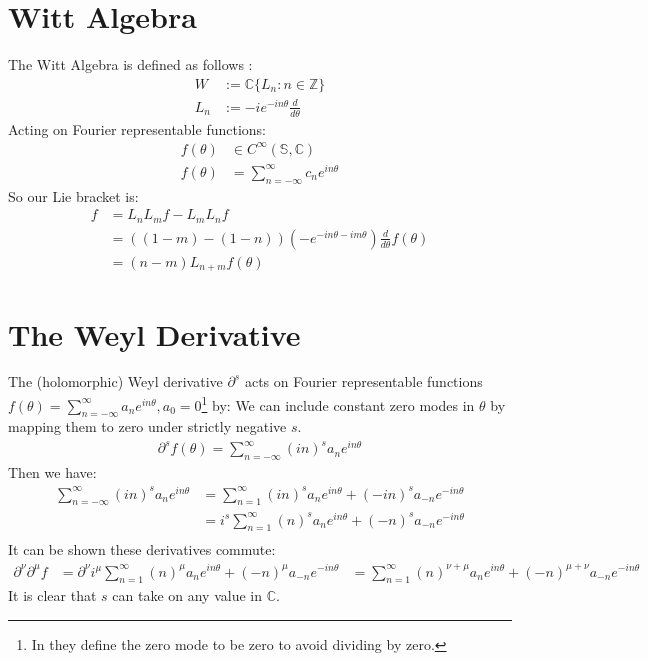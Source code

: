 \documentclass{artjlt}
\newcommand{\?}{\textbackslash}
\newcommand{\C}{\mathbb{C}}
\newcommand{\Z}{\mathbb{Z}}
\begin{document}
\section{Witt Algebra}
The Witt Algebra is defined as follows \cite{Schottenloher1997} \cite{Nam1999}:
\begin{align*}
W &:= \C \{L_n: n \in \Z\} \\
L_n &:= -i e^{-i n \theta} \frac{d}{d \theta}
\end{align*}
Acting on Fourier representable functions:
\begin{align*}
f(\theta) &\in C^\infty (\mathbb{S},\C) \\
f(\theta) &=\sum_{n=-\infty}^{\infty} c_n e^{i n \theta}
\end{align*} 
So our Lie bracket is:
\begin{align*}
  [L_n, L_m] f &= L_n L_m f - L_m L_n f \\
  &= ((1-m)-(1-n))(- e^{-i n \theta - i m \theta}) \frac{d}{d \theta} f(\theta) \\
  &=(n-m)L_{n+m} f(\theta)
\end{align*}
\section{The Weyl Derivative}
The (holomorphic) Weyl derivative $\partial^s$ \cite{article} acts on Fourier representable functions 
$f(\theta)= \sum_{n=-\infty}^\infty a_n e^{i n \theta}, a_0 = 0$\footnote{In \cite{article} they define the zero mode to be zero to avoid dividing by zero.} by:
We can include constant zero modes in $\theta$ by mapping them to zero under strictly negative $s$.
\begin{align*}
  \partial^s f(\theta)= \sum_{n=-\infty}^\infty (in)^s a_n e^{i n \theta}
\end{align*}
Then we have:
\begin{align*}
  \sum_{n=-\infty}^\infty (in)^s a_n e^{i n \theta} &= \sum_{n=1}^\infty (in)^s a_n e^{i n \theta} + (-in)^s a_{-n} e^{-i n \theta} \\
  &= i^s \sum_{n=1}^\infty (n)^s a_n e^{i n \theta} + (-n)^s a_{-n} e^{-i n \theta} \\
\end{align*}
It can be shown these derivatives commute:
\begin{align*}
  \partial^\nu \partial^\mu f &= \partial^\nu i^\mu \sum_{n=1}^\infty (n)^\mu a_n e^{i n \theta} + (-n)^\mu a_{-n} e^{-i n \theta}
  &= \sum_{n=1}^\infty (n)^{\nu+\mu} a_n e^{i n \theta} + (-n)^{\mu+\nu} a_{-n} e^{-i n \theta}
\end{align*}
\qedsymbol
It is clear that $s$ can take on any value in $\C$. 
\end{document}
